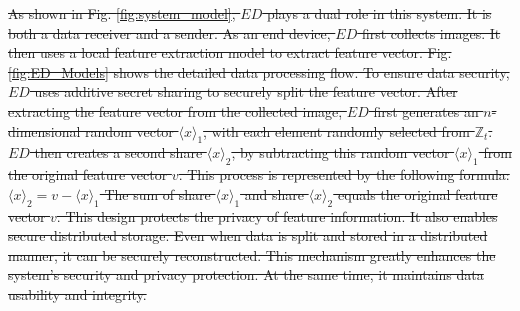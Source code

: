 ﻿\documentclass[conference]{IEEEtran}
\providecommand{\DIFdeltex}[1]{{\protect\color{red}\sout{#1}}}                      %
\providecommand{\DIFdelbegin}{} %
\providecommand{\DIFdelend}{} %
\providecommand{\DIFdel}[1]{\texorpdfstring{\DIFdeltex{#1}}{}} %
\newcommand{\DIFscaledelfig}{0.5}
\newlength{\DIFdelgraphicswidth} %
\newlength{\DIFdelgraphicsheight} %
\newcommand{\DIFdelincludegraphics}[2][]{%
\sbox{\DIFdelgraphicsbox}{\DIFOincludegraphics[#1]{#2}}%
\settoboxwidth{\DIFdelgraphicswidth}{\DIFdelgraphicsbox} %
\settoboxtotalheight{\DIFdelgraphicsheight}{\DIFdelgraphicsbox} %
\scalebox{\DIFscaledelfig}{%
\parbox[b]{\DIFdelgraphicswidth}{\usebox{\DIFdelgraphicsbox}\\[-\baselineskip] \rule{\DIFdelgraphicswidth}{0em}}\llap{\resizebox{\DIFdelgraphicswidth}{\DIFdelgraphicsheight}{%
\setlength{\unitlength}{\DIFdelgraphicswidth}%
\begin{picture}(1,1)%
\thicklines\linethickness{2pt} %
{\color[rgb]{1,0,0}\put(0,0){\framebox(1,1){}}}%
{\color[rgb]{1,0,0}\put(0,0){\line( 1,1){1}}}%
{\color[rgb]{1,0,0}\put(0,1){\line(1,-1){1}}}%
\end{picture}%
}\hspace*{3pt}}} %
} %
\DeclareRobustCommand{\DIFdelbegin}{\DIFOdelbegin \let\includegraphics\DIFdelincludegraphics} %
\DeclareRobustCommand{\DIFdelend}{\DIFOaddend \let\includegraphics\DIFOincludegraphics} %
\begin{document}
\DIFdelbegin \DIFdel{As shown in Fig. \ref{fig:system_model}, $ED$ plays a dual role in this system. It is both a data receiver and a sender. As an end device, $ED$ first collects images. It then uses a local feature extraction model to extract feature vector. Fig. \ref{fig:ED_Models} shows the detailed data processing flow. To ensure data security, $ED$ uses additive secret sharing to securely split the feature vector. After extracting the feature vector from the collected image, $ED$ first generates an $n$-dimensional random vector $\langle x \rangle_1$, with each element randomly selected from $\mathbb{Z}_t$. $ED$ then creates a second share $\langle x \rangle_2$, by subtracting this random vector $\langle x \rangle_1$ from the original feature vector $v$. This process is represented by the following formula:
$\langle x \rangle_2 = v - \langle x \rangle_1$
The sum of share $\langle x \rangle_1$ and share $\langle x \rangle_2$ equals the original feature vector $v$. This design protects the privacy of feature information. It also enables secure distributed storage. Even when data is split and stored in a distributed manner, it can be securely reconstructed. This mechanism greatly enhances the system's security and privacy protection. At the same time, it maintains data usability and integrity.
}\DIFdelend %
\end{document}
